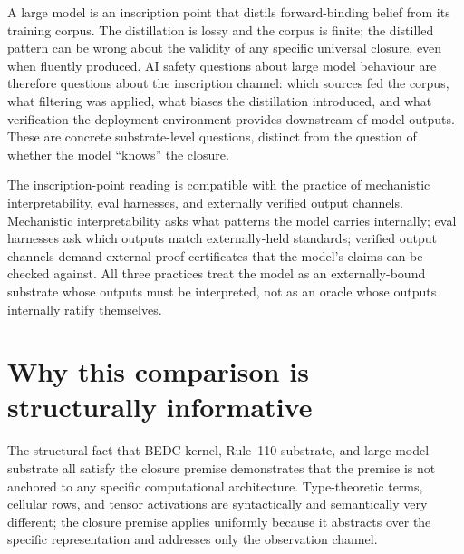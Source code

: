 \begin{principle}
\label{prin:large-model-ai-safety-reading}
A large model is an inscription point that distils forward-binding belief from its training corpus. The distillation is lossy and the corpus is finite; the distilled pattern can be wrong about the validity of any specific universal closure, even when fluently produced. AI safety questions about large model behaviour are therefore questions about the inscription channel: which sources fed the corpus, what filtering was applied, what biases the distillation introduced, and what verification the deployment environment provides downstream of model outputs. These are concrete substrate-level questions, distinct from the question of whether the model ``knows'' the closure.
\end{principle}

\begin{remark}
\label{rem:large-model-compatibility-with-ai-safety}
The inscription-point reading is compatible with the practice of mechanistic interpretability, eval harnesses, and externally verified output channels. Mechanistic interpretability asks what patterns the model carries internally; eval harnesses ask which outputs match externally-held standards; verified output channels demand external proof certificates that the model's claims can be checked against. All three practices treat the model as an externally-bound substrate whose outputs must be interpreted, not as an oracle whose outputs internally ratify themselves.
\end{remark}

\section{Why this comparison is structurally informative}
\label{sec:large-model-why-informative}

\begin{remark}
\label{rem:large-model-three-substrates-one-premise}
The structural fact that BEDC kernel, Rule~110 substrate, and large model substrate all satisfy the closure premise demonstrates that the premise is not anchored to any specific computational architecture. Type-theoretic terms, cellular rows, and tensor activations are syntactically and semantically very different; the closure premise applies uniformly because it abstracts over the specific representation and addresses only the observation channel.
\end{remark}

